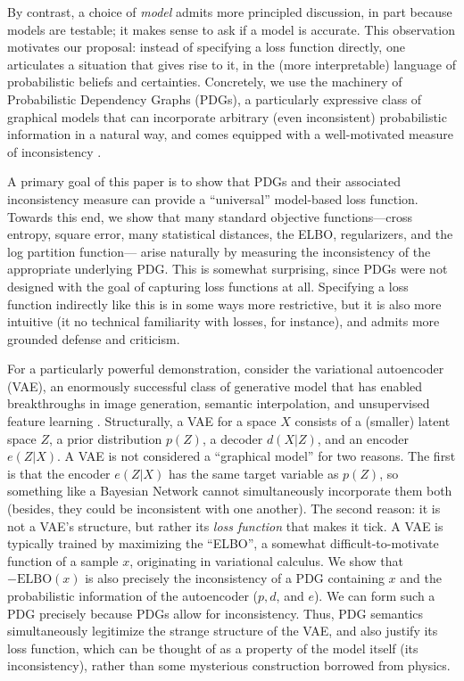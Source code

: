 By contrast, a choice of \emph{model} admits more principled
discussion, in part because
models are testable; it makes sense to ask if a model is accurate.
This observation motivates our proposal: instead of specifying a loss function directly,
one articulates a situation that gives rise to it, in the (more
interpretable) language of probabilistic beliefs and certainties. %
Concretely, we use the machinery of Probabilistic Dependency Graphs (PDGs),
a particularly expressive class of graphical models that can incorporate arbitrary (even inconsistent) probabilistic information in a natural way, and comes equipped with
a well-motivated measure of inconsistency  \parencite{pdg-aaai}.

A primary goal of this paper is to show that PDGs and their associated inconsistency measure can provide a ``universal'' model-based loss function.
Towards this end, we show that many standard objective functions---cross
entropy, square error, many statistical distances, the ELBO,
regularizers, and the log partition function---%
arise naturally by measuring the inconsistency of
the appropriate underlying PDG.
This is somewhat surprising, since PDGs were not designed with the
goal of capturing loss functions at all.
Specifying a loss function indirectly like this is in some ways more restrictive,
but it is also more intuitive
(it no technical familiarity with losses, for instance),
and admits more grounded defense and criticism.



For a particularly powerful demonstration, consider the variational
autoencoder (VAE), an enormously successful class of generative model
that has enabled breakthroughs in image generation, semantic
interpolation, and unsupervised feature learning
\parencite{kingma2013autoencoding}.
Structurally, a VAE for a space $X$ consists of a (smaller) latent space $Z$, a prior distribution $p(Z)$, a decoder $d(X | Z)$, and an encoder $e(Z| X)$.
A VAE is not considered a ``graphical model'' for two reasons.
The first is that the encoder $e(Z|X)$ has the same target variable as $p(Z)$, so
something like a Bayesian Network
cannot simultaneously incorporate them both
	(besides, they could be inconsistent with one another).
The second reason: it is not a VAE's structure, but rather its \emph{loss function} that makes
it tick.
A VAE is typically trained by
maximizing the ``ELBO'',
    a somewhat difficult-to-motivate function of a sample $x$, originating in variational calculus.
    We show that $-\mathrm{ELBO}(x)$ is also
    precisely the inconsistency of a PDG containing
	$x$
	and the probabilistic
    information of the autoencoder ($p, d$, and $e$).
We can form such a PDG precisely because PDGs allow for inconsistency.
Thus, PDG semantics simultaneously legitimize the strange structure of
the VAE, and also justify its loss function, which can be thought of
as a property of the model itself (its inconsistency), rather than
some mysterious construction borrowed from physics.




